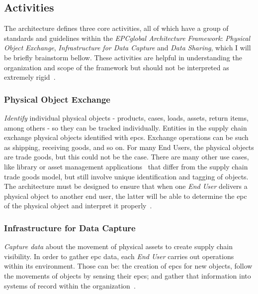 \subsection{Activities} \label{sec:activities}

The architecture defines three core activities, all of which have a group of standards and guidelines within the \emph{EPCglobal Architecture Framework}: \emph{Physical Object Exchange}, \emph{Infrastructure for Data Capture} and \emph{Data Sharing}, which I will be briefly brainstorm bellow.
These activities are helpful in understanding the organization and scope of the framework but should not be interpreted as extremely rigid~\cite{GS1EPCglobalArchitecture}.

\subsubsection{Physical Object Exchange} 

\emph{Identify} individual physical objects - products, cases, loads, assets, return items, among others - so they can be tracked individually.
Entities in the supply chain exchange physical objects identified with \acp{epc}.
Exchange operations can be such as shipping, receiving goods, and so on.
For many End Users, the physical objects are trade goods, but this could not be the case.
There are many other use cases, like library or asset management applications~\cite{dong-yingliDesignInternetThings2016} that differ from the supply chain trade goods model, but still involve unique identification and tagging of objects. 
The architecture must be designed to ensure that when one \emph{End User} delivers a physical object to another end user, the latter will be able to determine the \ac{epc} of the physical object and interpret it properly~\cite{GS1EPCglobalArchitecture}.

\subsubsection{Infrastructure for Data Capture} 

\emph{Capture data} about the movement of physical assets to create supply chain visibility.
In order to gather \ac{epc} data, each \emph{End User} carries out operations within its environment. Those can be: the creation of \acp{epc} for new objects, follow the movements of objects by sensing their \acp{epc}; and gather that information into systems of record within the organization~\cite{GS1EPCglobalArchitecture}.


